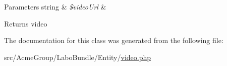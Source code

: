\begin{DoxyParams}[1]{Parameters}
string & {\em \$video\+Url} & \\
\hline
\end{DoxyParams}
\begin{DoxyReturn}{Returns}
video 
\end{DoxyReturn}


The documentation for this class was generated from the following file\+:\begin{DoxyCompactItemize}
\item 
src/\+Acme\+Group/\+Labo\+Bundle/\+Entity/\hyperlink{video_8php}{video.\+php}\end{DoxyCompactItemize}
